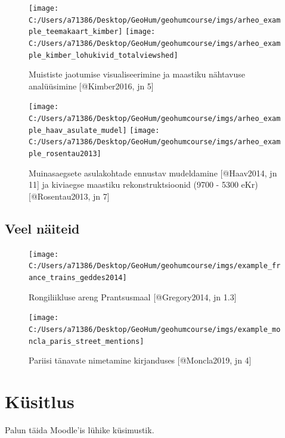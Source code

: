 \documentclass[
]{book}
\begin{document}
\begin{figure}
\texttt{[image: C:/Users/a71386/Desktop/GeoHum/geohumcourse/imgs/arheo\_example\_teemakaart\_kimber]} \texttt{[image: C:/Users/a71386/Desktop/GeoHum/geohumcourse/imgs/arheo\_example\_kimber\_lohukivid\_totalviewshed]} \caption{Muististe jaotumise visualiseerimine  ja maastiku nähtavuse analüüsimine [@Kimber2016, jn 5]}\label{fig:arheo-example}
\end{figure}

\begin{figure}
\texttt{[image: C:/Users/a71386/Desktop/GeoHum/geohumcourse/imgs/arheo\_example\_haav\_asulate\_mudel]} \texttt{[image: C:/Users/a71386/Desktop/GeoHum/geohumcourse/imgs/arheo\_example\_rosentau2013]} \caption{Muinasaegsete asulakohtade ennustav mudeldamine [@Haav2014, jn 11] ja kiviaegse maastiku rekonstruktsioonid (9700 - 5300 eKr) [@Rosentau2013, jn 7]}\label{fig:arheo-example2}
\end{figure}

\hypertarget{veel-nuxe4iteid}{%
\subsection{Veel näiteid}\label{veel-nuxe4iteid}}

\begin{figure}

{\centering \texttt{[image: C:/Users/a71386/Desktop/GeoHum/geohumcourse/imgs/example\_france\_trains\_geddes2014]} 

}

\caption{Rongiliikluse areng Prantsusmaal [@Gregory2014, jn 1.3]}\label{fig:more-examples1}
\end{figure}

\begin{figure}

{\centering \texttt{[image: C:/Users/a71386/Desktop/GeoHum/geohumcourse/imgs/example\_moncla\_paris\_street\_mentions]} 

}

\caption{Pariisi tänavate nimetamine kirjanduses [@Moncla2019, jn 4]}\label{fig:more-examples2}
\end{figure}

\hypertarget{kuxfcsitlus}{%
\section{Küsitlus}\label{kuxfcsitlus}}

Palun täida Moodle'is lühike küsimustik.
\end{document}
